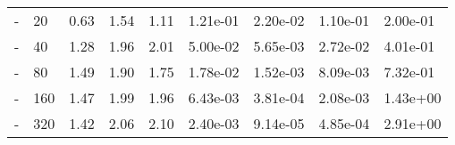\begin{table}[h]
{\begin{tabular}{cllllllll}
          - &  20 & 0.63 & 1.54 & 1.11 & 1.21e-01 & 2.20e-02 & 1.10e-01 & 2.00e-01 \\
          - &  40 & 1.28 & 1.96 & 2.01 & 5.00e-02 & 5.65e-03 & 2.72e-02 & 4.01e-01 \\
          - &  80 & 1.49 & 1.90 & 1.75 & 1.78e-02 & 1.52e-03 & 8.09e-03 & 7.32e-01 \\
          - & 160 & 1.47 & 1.99 & 1.96 & 6.43e-03 & 3.81e-04 & 2.08e-03 & 1.43e+00 \\
          - & 320 & 1.42 & 2.06 & 2.10 & 2.40e-03 & 9.14e-05 & 4.85e-04 & 2.91e+00 \\
   \hline

   \hline
   \end{tabular}
   }
\end{table}

\clearpage

